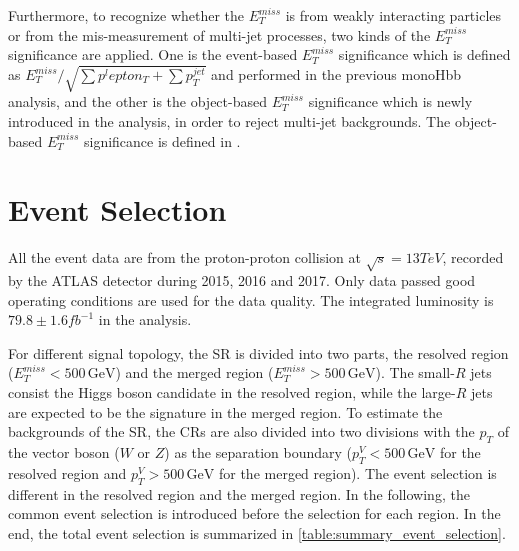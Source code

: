 \documentclass[class=NTHU_thesis, crop=false]{standalone}
\begin{document}
Furthermore, to recognize whether the $E^{miss}_T$ is from weakly interacting particles or from the mis-measurement of multi-jet processes, two kinds of the $E^{miss}_T$ significance are applied. One is the event-based $E^{miss}_T$ significance which is defined as $E^{miss}_T/\sqrt{{\sum}p^lepton_T+{\sum}p^{jet}_T}$ and performed in the previous monoHbb analysis\cite{Meehan:2225941}, and the other is the object-based $E^{miss}_T$ significance which is newly introduced in the analysis, in order to reject multi-jet backgrounds. The object-based $E^{miss}_T$ significance is defined in \cite{ATLAS-CONF-2018-038}.

\section{Event Selection}
All the event data are from the proton-proton collision at $\sqrt{s} = 13 TeV$, recorded by the ATLAS detector during 2015, 2016 and 2017. Only data passed good operating conditions are used for the data quality. The integrated luminosity is $79.8 \pm 1.6 fb^{-1}$ in the analysis.

For different signal topology, the SR is divided into two parts, the resolved region ($E^{miss}_T < 500\, \mathrm{GeV}$) and the merged region ($E^{miss}_T > 500\, \mathrm{GeV}$). The small-$R$ jets consist the Higgs boson candidate in the resolved region, while the large-$R$ jets are expected to be the signature in the merged region. To estimate the backgrounds of the SR, the CRs are also divided into two divisions with the $p_T$ of the vector boson ($W$ or $Z$) as the separation boundary ($p^V_T < 500\, \mathrm{GeV}$ for the resolved region and $p^V_T > 500\, \mathrm{GeV}$ for the merged region). The event selection is different in the resolved region and the merged region. In the following, the common event selection is introduced before the selection for each region. In the end, the total event selection is summarized in \cref{table:summary_event_selection}.
\end{document}

